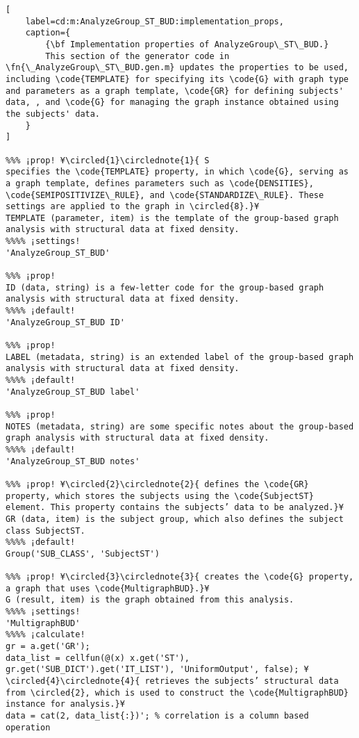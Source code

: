 \documentclass{tufte-handout}
\begin{document}
\begin{lstlisting}[
	label=cd:m:AnalyzeGroup_ST_BUD:implementation_props,
	caption={
		{\bf Implementation properties of AnalyzeGroup\_ST\_BUD.}
		This section of the generator code in \fn{\_AnalyzeGroup\_ST\_BUD.gen.m} updates the properties to be used, including \code{TEMPLATE} for specifying its \code{G} with graph type and parameters as a graph template, \code{GR} for defining subjects' data, , and \code{G} for managing the graph instance obtained using the subjects' data.
	}
]

%%% ¡prop! ¥\circled{1}\circlednote{1}{ S
specifies the \code{TEMPLATE} property, in which \code{G}, serving as a graph template, defines parameters such as \code{DENSITIES}, \code{SEMIPOSITIVIZE\_RULE}, and \code{STANDARDIZE\_RULE}. These settings are applied to the graph in \circled{8}.}¥
TEMPLATE (parameter, item) is the template of the group-based graph analysis with structural data at fixed density.
%%%% ¡settings!
'AnalyzeGroup_ST_BUD'

%%% ¡prop!
ID (data, string) is a few-letter code for the group-based graph analysis with structural data at fixed density.
%%%% ¡default!
'AnalyzeGroup_ST_BUD ID'

%%% ¡prop!
LABEL (metadata, string) is an extended label of the group-based graph analysis with structural data at fixed density.
%%%% ¡default!
'AnalyzeGroup_ST_BUD label'

%%% ¡prop!
NOTES (metadata, string) are some specific notes about the group-based graph analysis with structural data at fixed density.
%%%% ¡default!
'AnalyzeGroup_ST_BUD notes'

%%% ¡prop! ¥\circled{2}\circlednote{2}{ defines the \code{GR} property, which stores the subjects using the \code{SubjectST} element. This property contains the subjects’ data to be analyzed.}¥
GR (data, item) is the subject group, which also defines the subject class SubjectST.
%%%% ¡default!
Group('SUB_CLASS', 'SubjectST')

%%% ¡prop! ¥\circled{3}\circlednote{3}{ creates the \code{G} property, a graph that uses \code{MultigraphBUD}.}¥
G (result, item) is the graph obtained from this analysis.
%%%% ¡settings!
'MultigraphBUD'
%%%% ¡calculate!
gr = a.get('GR');
data_list = cellfun(@(x) x.get('ST'), gr.get('SUB_DICT').get('IT_LIST'), 'UniformOutput', false); ¥\circled{4}\circlednote{4}{ retrieves the subjects’ structural data from \circled{2}, which is used to construct the \code{MultigraphBUD} instance for analysis.}¥
data = cat(2, data_list{:})'; % correlation is a column based operation


\end{lstlisting}
\end{document}
